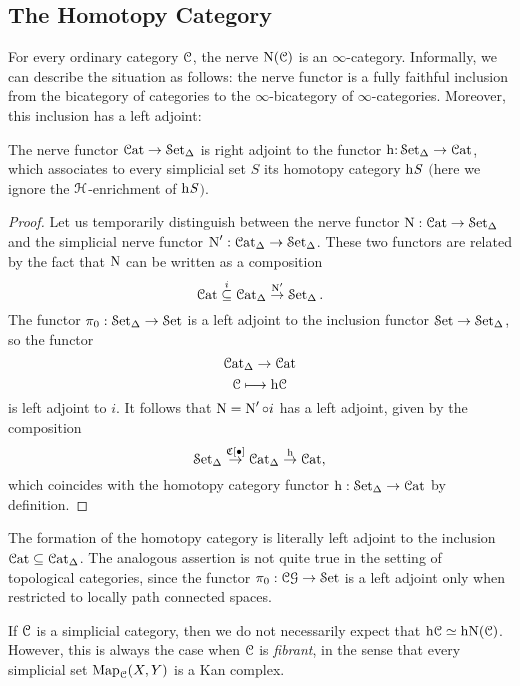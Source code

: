 \subsection{The Homotopy Category}\label{hcat}
\begin{1.2.3 The homotopy category}
For every ordinary category $\calC$, the nerve $\Nerve(\calC)$ is an $\infty$-category. 
Informally, we can describe the situation as follows: the nerve functor is a fully faithful inclusion from the bicategory of categories to the $\infty$-bicategory of $\infty$-categories.
Moreover, this inclusion has a left adjoint:

\begin{proposition}\label{leftadj}
The nerve functor $\Cat \rightarrow \sSet$ is right adjoint to the functor
$\h: \sSet \rightarrow \Cat$, which associates to every simplicial set $S$ its
homotopy category $\h{S}$ $($here we ignore the $\calH$-enrichment of $\h{S}${}$)$.
\end{proposition}

\begin{proof}
Let us temporarily distinguish between the nerve functor $\Nerve: \Cat \rightarrow \sSet$
and the simplicial nerve functor $\Nerve': \sCat \rightarrow \sSet$. These two functors are related by the fact that $\Nerve$ can be written as a composition
$$ \Cat \stackrel{i}{\subseteq} \sCat \stackrel{\Nerve'}{\rightarrow} \sSet.$$
The functor $\pi_0: \sSet \rightarrow \Set$ is a left adjoint to the inclusion functor
$\Set \rightarrow \sSet$, so the functor
$$ \sCat \rightarrow \Cat$$
$$ \calC \mapsto \h{\calC}$$
is left adjoint to $i$. It follows that $\Nerve = \Nerve' \circ i$ has a left adjoint, given by the composition
$$ \sSet \stackrel{ \sCoNerve[ \bigdot] }{\rightarrow} \sCat \stackrel{ \h{}}{\rightarrow} \Cat,$$
which coincides with the homotopy category functor $\h{}: \sSet \rightarrow \Cat$ by definition.
\end{proof}

\begin{remark}
The formation of the homotopy category is literally left adjoint to
the inclusion $\Cat \subseteq \sCat$. The analogous assertion is not
quite true in the setting of topological categories, since the
functor $\pi_0: \CG \rightarrow \Set$ is a left adjoint only when
restricted to locally path connected spaces.
\end{remark}

\begin{warning}
If $\calC$ is a simplicial category, then we do not necessarily
expect that $\h{\calC} \simeq \h{\sNerve(\calC)}$. However, this is always
the case when $\calC$ is {\it fibrant}, in the sense that every
simplicial set $\bHom_{\calC}(X,Y)$ is a Kan complex.
\end{warning}


\end{1.2.3 The homotopy category}
